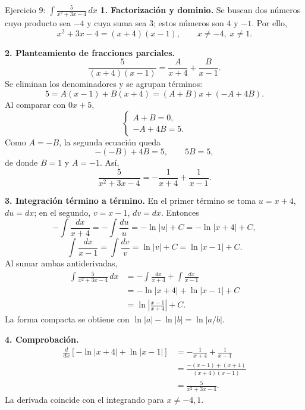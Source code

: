 \begin{examplebox}{Ejercicio 9: $\displaystyle \int\frac{5}{x^2+3x-4}\,dx$}
\textbf{1. Factorización y dominio.} Se buscan dos números cuyo producto sea $-4$ y cuya suma sea $3$; estos números son $4$ y $-1$. Por ello,
\[
 x^2+3x-4=(x+4)(x-1),
 \qquad x\ne-4,\;x\ne1.
\]

\textbf{2. Planteamiento de fracciones parciales.}
\[
 \frac5{(x+4)(x-1)}=\frac{A}{x+4}+\frac{B}{x-1}.
\]
Se eliminan los denominadores y se agrupan términos:
\[
 5=A(x-1)+B(x+4)=(A+B)x+(-A+4B).
\]
Al comparar con $0x+5$,
\[
 \begin{cases}
 A+B=0,\\
 -A+4B=5.
 \end{cases}
\]
Como $A=-B$, la segunda ecuación queda
\[
 -(-B)+4B=5,\qquad 5B=5,
\]
de donde $B=1$ y $A=-1$. Así,
\[
 \frac5{x^2+3x-4}=-\frac1{x+4}+\frac1{x-1}.
\]

\textbf{3. Integración término a término.} En el primer término se toma $u=x+4$, $du=dx$; en el segundo, $v=x-1$, $dv=dx$. Entonces
\[
 -\int\frac{dx}{x+4}=-\int\frac{du}{u}
 =-\ln|u|+C=-\ln|x+4|+C,
\]
\[
 \int\frac{dx}{x-1}=\int\frac{dv}{v}
 =\ln|v|+C=\ln|x-1|+C.
\]
Al sumar ambas antiderivadas,
\begin{align*}
 \int\frac5{x^2+3x-4}\,dx
 &=-\int\frac{dx}{x+4}+\int\frac{dx}{x-1}\\
 &=-\ln|x+4|+\ln|x-1|+C\\
 &=\boxed{\ln\left|\frac{x-1}{x+4}\right|+C}.
\end{align*}
La forma compacta se obtiene con $\ln|a|-\ln|b|=\ln|a/b|$.

\textbf{4. Comprobación.}
\begin{align*}
 \frac{d}{dx}\left[-\ln|x+4|+\ln|x-1|\right]
 &=-\frac1{x+4}+\frac1{x-1}\\
 &=\frac{-(x-1)+(x+4)}{(x+4)(x-1)}\\
 &=\frac5{x^2+3x-4}.
\end{align*}
La derivada coincide con el integrando para $x\ne-4,1$.
\end{examplebox}

